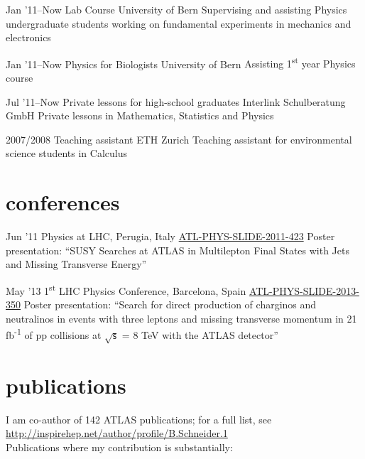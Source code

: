 \documentclass[]{cv} %
\begin{document}
\begin{entrylist}

\entry
{Jan '11--Now}
{Lab Course}
{University of Bern}
{Supervising and assisting Physics undergraduate students working on fundamental experiments in mechanics and electronics}

\entry
{Jan '11--Now}
{Physics for Biologists}
{University of Bern}
{Assisting 1\textsuperscript{st} year Physics course}

\entry
{Jul '11--Now}
{Private lessons for high-school graduates}
{Interlink Schulberatung GmbH}
{Private lessons in Mathematics, Statistics and Physics}

\entry
{2007/2008}
{Teaching assistant}
{ETH Zurich}
{Teaching assistant for environmental science students in Calculus}

\end{entrylist}

\section{conferences}

\begin{entrylist}

  \entry
  {Jun '11}
  {Physics at LHC, Perugia, Italy}
  {\href{https://cds.cern.ch/record/1371922}{ATL-PHYS-SLIDE-2011-423}}
  {Poster presentation: ``SUSY Searches at ATLAS in Multilepton Final States with Jets and Missing Transverse Energy''}

  \entry
  {May '13}
  {1\textsuperscript{st} LHC Physics Conference, Barcelona, Spain}
  {\href{https://cds.cern.ch/record/1555743}{ATL-PHYS-SLIDE-2013-350}}
  {Poster presentation: ``Search for direct production of charginos and neutralinos in events with three
    leptons and missing transverse momentum in 21 fb\textsuperscript{-1} of pp collisions at $\sqrt{\mathsf{s}}$ = 8 TeV with the ATLAS
detector''}

\end{entrylist}

\section{publications}
I am co-author of 142 ATLAS publications; for a full list, see \\
\href{http://inspirehep.net/author/profile/B.Schneider.1}{http://inspirehep.net/author/profile/B.Schneider.1}\\
Publications where my contribution is substantially:
\end{document}
